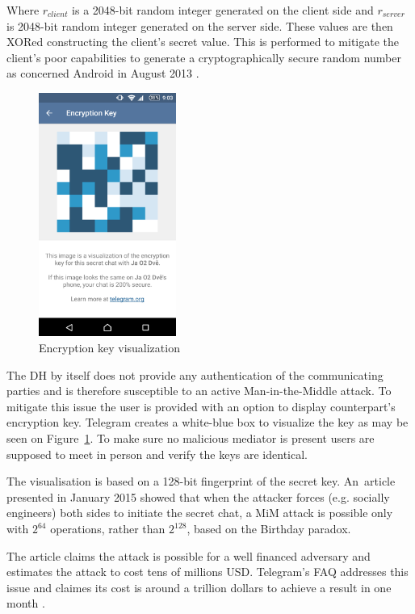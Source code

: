 \documentclass[thesis=M,english]{FITthesis}[2012/10/20]
\begin{document}
Where $r_{client}$ is a 2048-bit random integer generated on the client side and $r_{server}$ is 2048-bit random integer generated on the server side. These values are then XORed constructing the client's secret value. This is performed to mitigate the client's poor capabilities to generate a cryptographically secure random number as concerned Android in August 2013 \cite{telegram-android-securerandom}.

\begin{figure}[htb]
	\centering
	\includegraphics[width=0.4\textwidth]{telegram-keybox.png}
	\caption{Encryption key visualization}
	\label{img:telegram-keybox}
\end{figure}

The DH by itself does not provide any authentication of the communicating parties and is therefore susceptible to an active Man-in-the-Middle attack. To mitigate this issue the user is provided with an option to display counterpart's encryption key. Telegram creates a white-blue box to visualize the key as may be seen on Figure~\ref{img:telegram-keybox}. To make sure no malicious mediator is present users are supposed to meet in person and verify the keys are identical.

The visualisation is based on a 128-bit fingerprint of the secret key. An~article presented in January 2015 showed \cite{telegram-264} that when the attacker forces (e.g. socially engineers) both sides to initiate the secret chat, a MiM attack is possible only with $2^{64}$ operations, rather than $2^{128}$, based on the Birthday paradox.

The article claims the attack is possible for a well financed adversary and estimates the attack to cost tens of millions USD. Telegram's FAQ addresses this issue and claimes its cost is around a trillion dollars to achieve a result in one month \cite{telegram-techfaq}.
\end{document}
